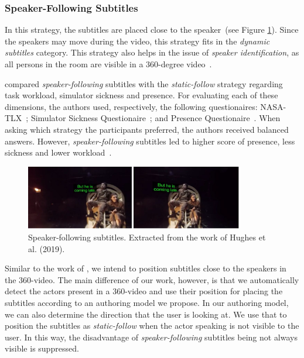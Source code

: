 \subsubsection{Speaker-Following Subtitles}
\label{subsubsec:speaker_following}

In this strategy, the subtitles are placed close to the speaker~(see Figure \ref{fig:speaker_following}). Since the speakers may move during the video, this strategy fits in the \emph{dynamic subtitles} category. This strategy also helps in the issue of \emph{speaker identification}, as all persons in the room are visible in a 360-degree video~\cite{rothe_dynamic_2018}.  

\cite{rothe_dynamic_2018} compared \emph{speaker-following} subtitles with the \emph{static-follow} strategy regarding task workload, simulator sickness and presence. For evaluating each of these dimensions, the authors used, respectively, the following questionaires: NASA-TLX~\cite{nasa_hart1988development}; Simulator Sickness Questionaire~\cite{sickness_kennedy1993simulator}; and Presence Questionaire~\cite{presence_witmer1998measuring}. When asking which strategy the participants preferred, the authors received balanced answers. However, \emph{speaker-following} subtitles led to higher score of presence, less sickness and lower workload~\cite{rothe_dynamic_2018}.

\begin{figure}[!ht]
    \centering
    \includegraphics[width=0.85\textwidth]{img/video360/speaker-following.png}
    \caption{Speaker-following subtitles. Extracted from the work of Hughes et al. (2019).}
    \label{fig:speaker_following}
\end{figure}


Similar to the work of \cite{rothe_dynamic_2018}, we intend to position subtitles close to the speakers in the 360-video. The main difference of our work, however, is that we automatically detect the actors present in a 360-video and use their position for placing the subtitles according to an authoring model we propose. In our authoring model, we can also determine the direction that the user is looking at. We use that to position the subtitles as \emph{static-follow} when the actor speaking is not visible to the user. In this way, the disadvantage of \emph{speaker-following} subtitles being not always visible is suppressed.
